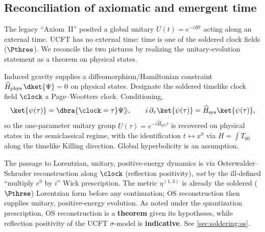 \subsection{Reconciliation of axiomatic and emergent time}
\label{sec:axioms:time}

The legacy ``Axiom~II'' posited a global unitary $U(t)=e^{-iHt}$ acting along
an external time. UCFT has no external time: time is one of the soldered
clock fields ($\Pthree$). We reconcile the two pictures by realizing the
unitary-evolution statement as a theorem on physical states.

\begin{theorem}\label{thm:axioms:time}
Induced gravity supplies a diffeomorphism/Hamiltonian constraint
$\widehat H_{\mathrm{phys}}\,\dket{\Psi}=0$ on physical states. Designate the
soldered timelike clock field $\clock$ a Page--Wootters clock. Conditioning,
\[
  \ket{\psi(\tau)}=\dbra{\clock=\tau}\Psi\rangle\!\rangle,
  \qquad
  i\,\partial_\tau\ket{\psi(\tau)}=\widehat H_{\mathrm{sys}}\ket{\psi(\tau)},
\]
so the one-parameter unitary group $U(\tau)=e^{-i\widehat H_{\mathrm{sys}}\tau}$
is recovered on physical states in the semiclassical regime, with the
identification $t\leftrightarrow x^0$ via
$H=\int T_{00}$ along the timelike Killing direction. Global hyperbolicity is
an assumption.
\end{theorem}

\begin{remark}\label{rem:axioms:os}
The passage to Lorentzian, unitary, positive-energy dynamics is via
Osterwalder--Schrader reconstruction along $\clock$ (reflection positivity),
\emph{not} by the ill-defined ``multiply $e^0$ by $i$'' Wick prescription.
The metric $\eta^{(1,3)}$ is already the soldered ($\Pthree$) Lorentzian form
before any continuation; OS reconstruction then supplies unitary,
positive-energy evolution. As noted under the quantization prescription, OS
reconstruction is a \textbf{theorem} given its hypotheses, while reflection
positivity of the UCFT $\sigma$-model is \textbf{indicative}. See
\autoref{sec:soldering:os}.
\end{remark}
